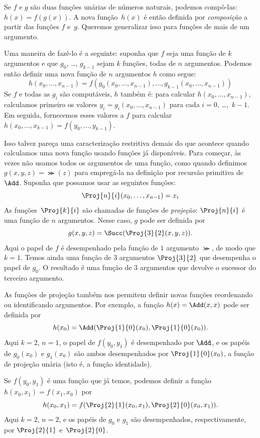 \documentclass[../../../include/open-logic-section]{subfiles}
\begin{document}

Se $f$ e $g$ são duas funções unárias de números naturais, podemos
compô-las: $h(x) = f(g(x))$. A nova função~$h(x)$ é então definida por
\emph{composição} a partir das funções $f$ e~$g$. Queremos generalizar isso
para funções de mais de um argumento.

Uma maneira de fazê-lo é a seguinte: suponha que $f$ seja uma função de
$k$ argumentos e que $g_0$, \dots, $g_{k-1}$ sejam $k$ funções, todas de
$n$ argumentos. Podemos então definir uma nova função de $n$ argumentos $h$
como segue:
\[
h(x_0, \dots, x_{n-1}) =
f(g_0(x_0, \dots, x_{n-1}), \dots, g_{k-1}(x_0, \dots, x_{n-1}))
\]
Se $f$ e todas as $g_i$ são computáveis, $h$ também é: para calcular
$h(x_0, \dots, x_{n-1})$, calculamos primeiro os valores
$y_i = g_i(x_0, \dots, x_{n-1})$ para cada $i = 0$, \dots,~$k-1$. Em
seguida, fornecemos esses valores a $f$ para calcular
$h(x_0, \dots, x_{k-1}) = f(y_0, \dots, y_{k-1})$.

Isso talvez pareça uma caracterização restritiva demais do que acontece
quando calculamos uma nova função usando funções já disponíveis. Para começar,
às vezes não usamos todos os argumentos de uma função, como quando definimos
$g(x, y, z) = \Succ(z)$ para empregá-la na definição por recursão primitiva
de~$\Add$. Suponha que possamos usar as seguintes funções:
\[
\Proj{n}{i}(x_0, \dots, x_{n-1}) = x_i
\]
As funções~$\Proj{k}{i}$ são chamadas de funções de \emph{projeção}:
$\Proj{n}{i}$ é uma função de $n$ argumentos. Nesse caso, $g$ pode ser
definida por
\[
g(x, y, z) = \Succ(\Proj{3}{2}(x, y, z)).
\]
Aqui o papel de $f$ é desempenhado pela função de $1$ argumento $\Succ$, de
modo que $k=1$. Temos ainda uma função de $3$ argumentos $\Proj{3}{2}$ que
desempenha o papel de $g_0$. O resultado é uma função de $3$ argumentos que devolve o
sucessor do terceiro argumento.

As funções de projeção também nos permitem definir novas funções reordenando
ou identificando argumentos. Por exemplo, a função $h(x) = \Add(x, x)$ pode
ser definida por
\[
h(x_0) = \Add(\Proj{1}{0}(x_0),\Proj{1}{0}(x_0)).
\]
Aqui $k=2$, $n=1$, o papel de $f(y_0,y_1)$ é desempenhado por $\Add$, e os
papéis de $g_0(x_0)$ e $g_1(x_0)$ são ambos desempenhados por
$\Proj{1}{0}(x_0)$, a função de projeção unária (isto é, a função identidade).

Se $f(y_0, y_1)$ é uma função que já temos, podemos definir a função
$h(x_0, x_1) = f(x_1, x_0)$ por
\[
h(x_0, x_1) = f(\Proj{2}{1}(x_0, x_1),\Proj{2}{0}(x_0, x_1)).
\]
Aqui $k=2$, $n = 2$, e os papéis de $g_0$ e $g_1$ são desempenhados,
respectivamente, por $\Proj{2}{1}$ e~$\Proj{2}{0}$.
\end{document}
